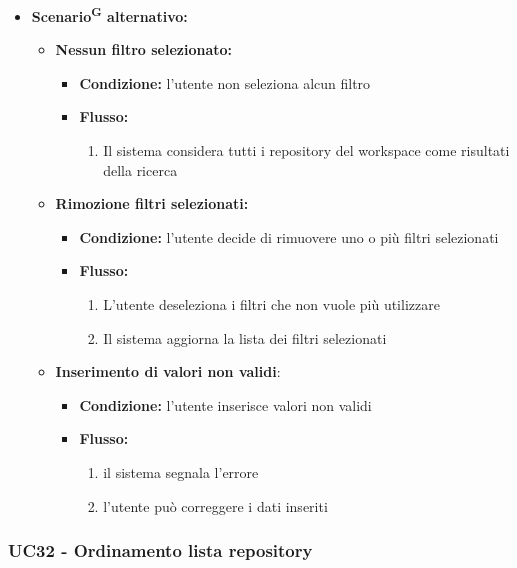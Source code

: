 \documentclass[a4paper, 11pt]{article}
\begin{document}
\begin{itemize}
	\item \textbf{Scenario\textsuperscript{G} alternativo:}
	\begin{itemize}
		\item \textbf{Nessun filtro selezionato:}
			\begin{itemize}
				\item \textbf{Condizione:} l'utente non seleziona alcun filtro
				\item \textbf{Flusso:}
				\begin{enumerate}
					\item Il sistema considera tutti i repository del workspace come risultati della ricerca
				\end{enumerate}
			\end{itemize}
		\item \textbf{Rimozione filtri selezionati:}
			\begin{itemize}
				\item \textbf{Condizione:} l'utente decide di rimuovere uno o più filtri selezionati
				\item \textbf{Flusso:}
				\begin{enumerate}
					\item L'utente deseleziona i filtri che non vuole più utilizzare
					\item Il sistema aggiorna la lista dei filtri selezionati
				\end{enumerate}
			\end{itemize}
		\item \textbf{Inserimento di valori non validi}:
		\begin{itemize}
				\item \textbf{Condizione:} l'utente inserisce valori non validi
				\item \textbf{Flusso:}
				\begin{enumerate}
					\item il sistema segnala l'errore
					\item l'utente può correggere i dati inseriti
				\end{enumerate}
		\end{itemize}
	\end{itemize}
\end{itemize}

\subsubsection{UC32 - Ordinamento lista repository}\label{UC32}
\end{document}
